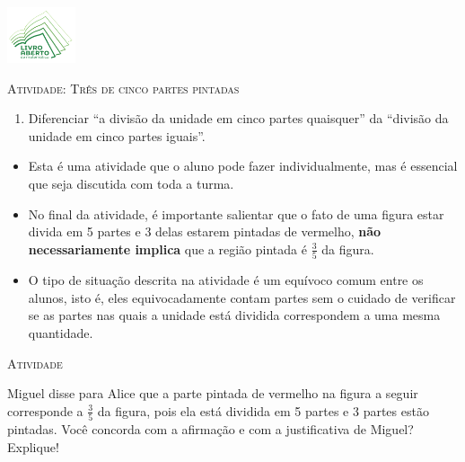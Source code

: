 \documentclass[10 pt,usenames,dvipsnames, oneside]{article}
\begin{document}
\begin{center}
  \begin{minipage}[l]{3cm}
\includegraphics[width=2cm]{logo}    
\end{minipage}\hfill
\begin{minipage}[r]{.8\textwidth}
 {\Large \scshape Atividade: Três de cinco partes pintadas}  
\end{minipage}
\end{center}
\vspace{.2cm}

\ifdefined\prof
\begin{goals}
\begin{enumerate}

    \item Diferenciar ``a divisão da unidade em cinco partes quaisquer'' da ``divisão da unidade em cinco partes iguais''.

\end{enumerate}
\tcblower

\begin{itemize} %
    \item       Esta é uma atividade que o aluno pode fazer individualmente, mas é essencial que seja discutida com toda a turma.
    \item       No final da atividade, é importante salientar que o fato de  uma figura estar divida em 5 partes e 3 delas estarem pintadas de vermelho,       {\bf não necessariamente implica}       que a região pintada é       $\frac{3}{5}$ da figura.
    \item       O tipo de situação descrita na atividade é um equívoco comum entre os alunos, isto é, eles equivocadamente contam partes sem o cuidado de verificar se as partes nas quais a unidade está dividida correspondem a uma mesma quantidade.
\end{itemize} %

\end{goals}

\bigskip
\begin{center}
{\large \scshape Atividade}
\end{center}
\fi

Miguel disse para Alice que a parte pintada de vermelho na figura a seguir corresponde a $\frac{3}{5}$ da figura, pois ela está dividida em 5 partes e 3 partes estão pintadas. Você concorda com a afirmação e com a justificativa de Miguel? Explique!
\end{document}
